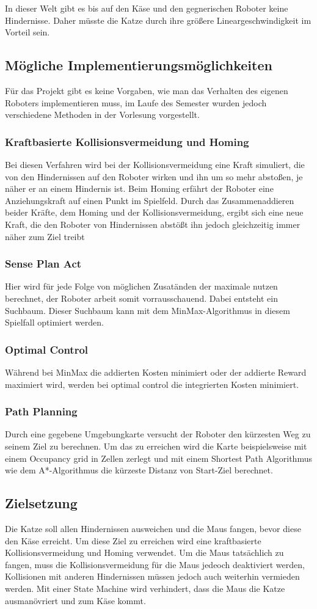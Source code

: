 \documentclass[
a4paper,     %
12pt         %
]{scrartcl}  %
\begin{document}
In dieser Welt gibt es bis auf den Käse und den gegnerischen Roboter keine Hindernisse. Daher müsste die Katze durch ihre größere Lineargeschwindigkeit im Vorteil sein.
\subsection{Mögliche Implementierungsmöglichkeiten}
Für das Projekt gibt es keine Vorgaben, wie man das Verhalten des eigenen Roboters implementieren muss, 
im Laufe des Semester wurden jedoch verschiedene Methoden in der Vorlesung vorgestellt.
\subsubsection{Kraftbasierte Kollisionsvermeidung und Homing}
Bei diesen Verfahren wird bei der Kollisionsvermeidung eine Kraft simuliert, die von den Hindernissen auf den Roboter wirken und ihn um so mehr abstoßen, je näher er an einem Hindernis ist. Beim Homing erfährt der Roboter eine Anziehungskraft auf einen Punkt im Spielfeld. Durch das Zusammenaddieren beider Kräfte, dem Homing und der Kollisionsvermeidung, ergibt sich eine neue Kraft, die den Roboter von Hindernissen abstößt ihn jedoch gleichzeitig immer näher zum Ziel treibt 
\subsubsection{Sense Plan Act}
Hier wird für jede Folge von möglichen Zusatänden der maximale nutzen berechnet, der Roboter arbeit somit vorrausschauend. Dabei entsteht ein Suchbaum. Dieser Suchbaum kann mit dem MinMax-Algorithmus in diesem Spielfall optimiert werden.
\subsubsection{Optimal Control}
Während bei MinMax die addierten Kosten minimiert oder der addierte Reward maximiert wird, werden bei optimal control die integrierten Kosten minimiert.
\subsubsection{Path Planning}
Durch eine gegebene Umgebungkarte versucht der Roboter den kürzesten Weg zu seinem Ziel zu berechnen. Um das zu erreichen wird die Karte beispielsweise mit einem Occupancy grid in Zellen zerlegt und mit einem Shortest Path Algorithmus wie dem A*-Algorithmus die kürzeste Distanz von Start-Ziel berechnet.  
\subsection{Zielsetzung}
Die Katze soll allen Hindernissen ausweichen und die Maus fangen, bevor diese den Käse erreicht. Um diese Ziel zu erreichen wird eine kraftbasierte Kollisionsvermeidung und Homing verwendet. Um die Maus tatsächlich zu fangen, muss die Kollisionsvermeidung für die Maus jedeoch deaktiviert werden, Kollisionen mit anderen Hindernissen müssen jedoch auch weiterhin vermieden werden. Mit einer State Machine wird verhindert, dass die Maus die Katze ausmanövriert und zum Käse kommt.
\clearpage
\end{document}
